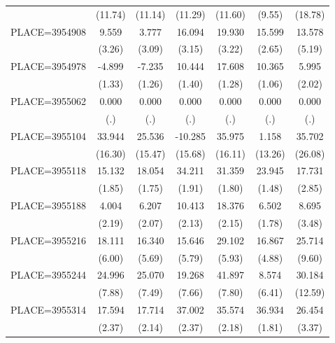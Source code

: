 {\begin{tabular}{l*{6}{c}}
                    &     (11.74)&     (11.14)&     (11.29)&     (11.60)&      (9.55)&     (18.78)\\
PLACE=3954908       &       9.559&       3.777&      16.094&      19.930&      15.599&      13.578\\
                    &      (3.26)&      (3.09)&      (3.15)&      (3.22)&      (2.65)&      (5.19)\\
PLACE=3954978       &      -4.899&      -7.235&      10.444&      17.608&      10.365&       5.995\\
                    &      (1.33)&      (1.26)&      (1.40)&      (1.28)&      (1.06)&      (2.02)\\
PLACE=3955062       &       0.000&       0.000&       0.000&       0.000&       0.000&       0.000\\
                    &         (.)&         (.)&         (.)&         (.)&         (.)&         (.)\\
PLACE=3955104       &      33.944&      25.536&     -10.285&      35.975&       1.158&      35.702\\
                    &     (16.30)&     (15.47)&     (15.68)&     (16.11)&     (13.26)&     (26.08)\\
PLACE=3955118       &      15.132&      18.054&      34.211&      31.359&      23.945&      17.731\\
                    &      (1.85)&      (1.75)&      (1.91)&      (1.80)&      (1.48)&      (2.85)\\
PLACE=3955188       &       4.004&       6.207&      10.413&      18.376&       6.502&       8.695\\
                    &      (2.19)&      (2.07)&      (2.13)&      (2.15)&      (1.78)&      (3.48)\\
PLACE=3955216       &      18.111&      16.340&      15.646&      29.102&      16.867&      25.714\\
                    &      (6.00)&      (5.69)&      (5.79)&      (5.93)&      (4.88)&      (9.60)\\
PLACE=3955244       &      24.996&      25.070&      19.268&      41.897&       8.574&      30.184\\
                    &      (7.88)&      (7.49)&      (7.66)&      (7.80)&      (6.41)&     (12.59)\\
PLACE=3955314       &      17.594&      17.714&      37.002&      35.574&      36.934&      26.454\\
                    &      (2.37)&      (2.14)&      (2.37)&      (2.18)&      (1.81)&      (3.37)\\

\end{tabular}}
